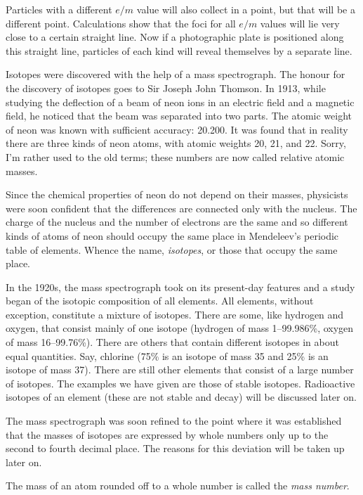 Particles with a different $e/m$ value will also collect in a point, but that will be a different point. Calculations show that the foci for all $e/m$ values will lie very close to a certain straight line. Now if a photographic plate is positioned along this straight line, particles of each kind will reveal themselves by a separate line.

Isotopes were discovered with the help of a mass spec­trograph. The honour for the discovery of isotopes goes to Sir Joseph John Thomson. In 1913, while studying the deflection of a beam of neon ions in an electric field and a magnetic field, he noticed that the beam was sepa­rated into two parts. The atomic weight of neon was known with sufficient accuracy: \num{20.200}. It was found that in reality there are three kinds of neon atoms, with atomic weights 20, 21, and 22. Sorry, I’m rather used to the old terms; these numbers are now called relative atomic masses.

Since the chemical properties of neon do not depend on their masses, physicists were soon confident that the differences are connected only with the nucleus. The charge of the nucleus and the number of electrons are the same and so different kinds of atoms of neon should occupy the same place in Mendeleev’s periodic table of elements. Whence the name, \emph{isotopes}, or those that occu­py the same place.

In the 1920s, the mass spectrograph took on its present-day features and a study began of the isotopic compo­sition of all elements. All elements, without exception, constitute a mixture of isotopes. There are some, like hydrogen and oxygen, that consist mainly of one isotope (hydrogen of mass 1--99.986\%, oxygen of mass 16--99.76\%). There are others that contain different isotopes in about equal quantities. Say, chlorine (75\% is an isotope of mass 35 and 25\% is an isotope of mass 37). There are still other elements that consist of a large num­ber of isotopes. The examples we have given are those of stable isotopes. Radioactive isotopes of an element (these are not stable and decay) will be discussed later on.

The mass spectrograph was soon refined to the point where it was established that the masses of isotopes are expressed by whole numbers only up to the second to fourth decimal place. The reasons for this deviation will be taken up later on.

The mass of an atom rounded off to a whole number is called the \emph{mass number}.

